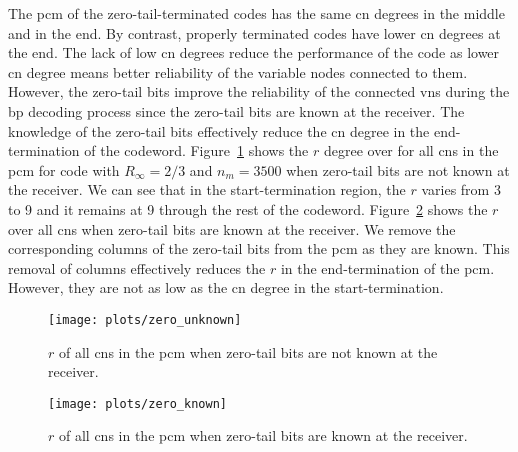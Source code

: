 The \gls{pcm} of the zero-tail-terminated codes has the same \gls{cn} degrees in the middle and in the end. By contrast, properly terminated codes have lower \gls{cn} degrees at the end. The lack of low \gls{cn} degrees reduce the performance of the code as lower \gls{cn} degree means better reliability of the variable nodes connected to them. However, the zero-tail bits improve the reliability of the connected \glspl{vn} during the \gls{bp} decoding process since the zero-tail bits are known at the receiver. The knowledge of the zero-tail bits effectively reduce the \gls{cn} degree in the end-termination of the codeword. Figure~\ref{fig:zero_unknown} shows the $r$ degree over for all \glspl{cn} in the \gls{pcm} for code with $R_\infty=2/3$ and $n_m=3500$ when zero-tail bits are not known at the receiver. We can see that in the start-termination region, the $r$ varies from 3 to 9 and it remains at 9 through the rest of the codeword. Figure~\ref{fig:zero_known} shows the $r$ over all \glspl{cn} when zero-tail bits are known at the receiver. We remove the corresponding columns of the zero-tail bits from the \gls{pcm} as they are known. This removal of columns effectively reduces the $r$ in the end-termination of the \gls{pcm}. However, they are not as low as the \gls{cn} degree in the start-termination.

\begin{figure}[htbp]
  \centering
  \texttt{[image: plots/zero\_unknown]}
  \caption[\gls{cn} degrees when zero-tail bits are unknown.]{$r$ of all \glspl{cn} in the \gls{pcm} when zero-tail bits are not known at the receiver.}
  \label{fig:zero_unknown}
\end{figure}

\begin{figure}[htbp]
  \centering
  \texttt{[image: plots/zero\_known]}
  \caption[\gls{cn} degrees when zero-tail bits are known.]{$r$ of all \glspl{cn} in the \gls{pcm} when zero-tail bits are known at the receiver.}
\label{fig:zero_known}
\end{figure}

